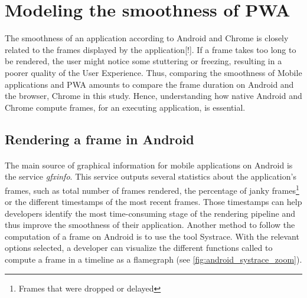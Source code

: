 \documentclass{kththesis}
\newcommand{\citationneeded}{\todo{Citation needed}[!]}
\begin{document}

\section{Modeling the smoothness of PWA}
\label{method:smoothness}
    
    The smoothness of an application according to Android and Chrome is closely related to the frames displayed by the application\citationneeded. If a frame takes too long to be rendered, the user might notice some stuttering or freezing, resulting in a poorer quality of the User Experience. Thus, comparing the smoothness of Mobile applications and PWA amounts to compare the frame duration on Android and the browser, Chrome in this study. Hence, understanding how native Android and Chrome compute frames, for an executing application, is essential. 
    
    \subsection{Rendering a frame in Android}
    
    \paragraph{}
    The main source of graphical information for mobile applications on Android is the service \textit{gfxinfo}. This service outputs several statistics about the application's frames, such as total number of frames rendered, the percentage of janky frames\footnote{Frames that were dropped or delayed} or the different timestamps of the most recent frames. Those timestamps can help developers identify the most time-consuming stage of the rendering pipeline and thus improve the smoothness of their application. \newline
    \indent Another method to follow the computation of a frame on Android is to use the tool Systrace. With the relevant options selected, a developer can visualize the different functions called to compute a frame in a timeline as a flamegraph (see \autoref{fig:android_systrace_zoom}).
    
\end{document}
